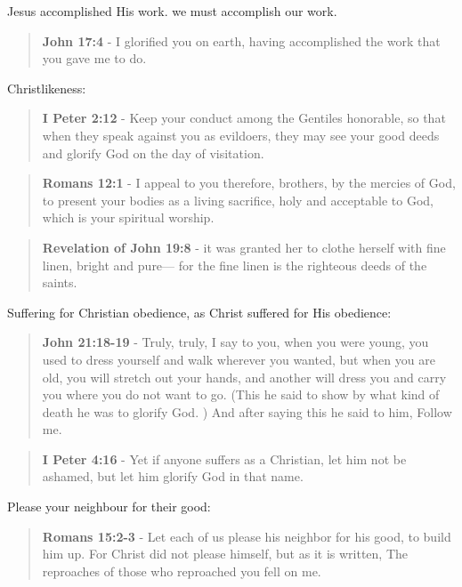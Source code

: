 \documentclass[11pt]{article}
\begin{document}
Jesus accomplished His work.
we must accomplish our work.

\begin{quote}
\textbf{John 17:4} - I glorified you on earth, having accomplished the work that you gave me to do.
\end{quote}

Christlikeness:

\begin{quote}
\textbf{I Peter 2:12} - Keep your conduct among the Gentiles honorable, so that when they speak against you as evildoers, they may see your good deeds and glorify God on the day of visitation.
\end{quote}

\begin{quote}
\textbf{Romans 12:1} - I appeal to you therefore, brothers, by the mercies of God, to present your bodies as a living sacrifice, holy and acceptable to God, which is your spiritual worship.
\end{quote}

\begin{quote}
\textbf{Revelation of John 19:8} - it was granted her to clothe herself with fine linen, bright and pure— for the fine linen is the righteous deeds of the saints.
\end{quote}

Suffering for Christian obedience, as Christ suffered for His obedience:

\begin{quote}
\textbf{John 21:18-19} - Truly, truly, I say to you, when you were young, you used to dress yourself and walk wherever you wanted, but when you are old, you will stretch out your hands, and another will dress you and carry you where you do not want to go. (This he said to show by what kind of death he was to glorify God. ) And after saying this he said to him, Follow me.
\end{quote}

\begin{quote}
\textbf{I Peter 4:16} - Yet if anyone suffers as a Christian, let him not be ashamed, but let him glorify God in that name.
\end{quote}

Please your neighbour for their good:

\begin{quote}
\textbf{Romans 15:2-3} - Let each of us please his neighbor for his good, to build him up. For Christ did not please himself, but as it is written, The reproaches of those who reproached you fell on me.
\end{quote}
\end{document}
